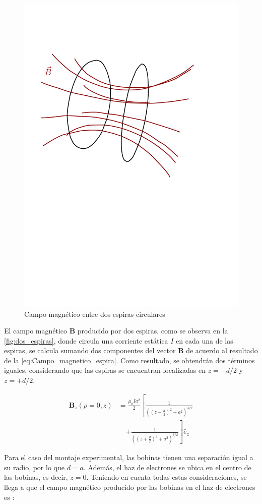 \begin{figure}[H]
  \centering
  \includegraphics[width=0.6\linewidth]{./images/coils-field.pdf}
  \caption{Campo magnético entre dos espiras circulares}
  \label{fig:CM_dos_espiras}
\end{figure}

El campo magnético $\mathbf{B}$ producido por dos espiras, como se observa en la
\cref{fig:dos_espiras}, donde circula una corriente estática $I$ en cada una de
las espiras, se calcula sumando dos componentes del vector $\mathbf{B}$ de
acuerdo al resultado de la \cref{eq:Campo_magnetico_espira}.
Como resultado, se obtendrán dos términos iguales, considerando que las espiras
se encuentran localizadas en $z = -d/2$ y $z = +d/2$.

\begin{equation}
  \begin{aligned}
    \mathbf{B}_{z}(\rho=0,z) &= \frac{\mu_{0} I a^{2}}{2} \left[ \frac{1}{\left((z-\frac{d}{2})^{2} + a^{2}\right)^{3/2}} \right.\\
                             &\quad \left.+ \frac{1}{\left((z+\frac{d}{2})^{2} + a^{2}\right)^{3/2}} \right] \hat{e}_{z}
                             \label{Campo_magnetico_2espiras}
  \end{aligned}
\end{equation}

Para el caso del montaje experimental, las bobinas tienen una separación igual a
su radio, por lo que \( d = a \).
Además, el haz de electrones se ubica en el centro de las bobinas, es decir,
\( z = 0 \). Teniendo en cuenta todas estas consideraciones, se llega a que el
campo magnético producido por las bobinas en el haz de electrones es
\cite{boix_practica_2}:

